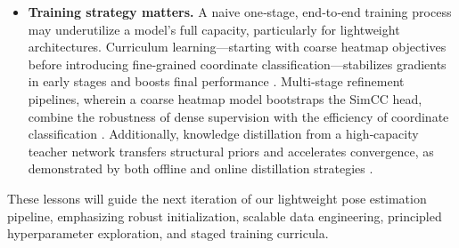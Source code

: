 \begin{itemize}
  \item \textbf{Training strategy matters.} A naive one‐stage, end‐to‐end training process may underutilize a model’s full capacity, particularly for lightweight architectures. Curriculum learning—starting with coarse heatmap objectives before introducing fine‐grained coordinate classification—stabilizes gradients in early stages and boosts final performance \cite{Bengio2009Curriculum}. Multi‐stage refinement pipelines, wherein a coarse heatmap model bootstraps the SimCC head, combine the robustness of dense supervision with the efficiency of coordinate classification \cite{Zhang2020LPN}. Additionally, knowledge distillation from a high‐capacity teacher network transfers structural priors and accelerates convergence, as demonstrated by both offline and online distillation strategies \cite{Hinton2015Distill,Li2021OKD}.
\end{itemize}

These lessons will guide the next iteration of our lightweight pose estimation pipeline, emphasizing robust initialization, scalable data engineering, principled hyperparameter exploration, and staged training curricula.
